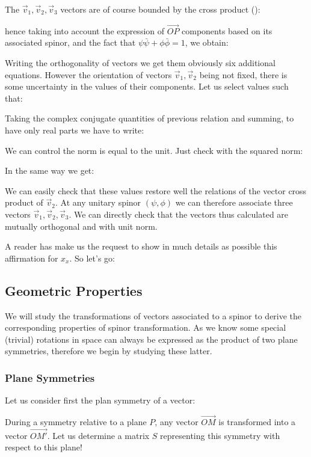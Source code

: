 	The $\vec{v}_1,\vec{v}_2,\vec{v}_3$ vectors are of course bounded by the cross product ():
	
	hence taking into account the expression of $\overrightarrow{OP}$ components based on its associated spinor, and the fact that $\psi\bar{\psi}+\phi\bar{\phi}=1$, we obtain:
	
	Writing the orthogonality of vectors we get them obviously six additional equations. However the orientation of vectors $\vec{v}_1,\vec{v}_2$ being not fixed, there is some uncertainty in the values of their components. Let us select values such that:
	
	Taking the complex conjugate quantities of previous relation and summing, to have only real parts we have to write:
	
	We can control the norm is equal to the unit. Just check with the squared norm:
	
	In the same way we get:
	
	We can easily check that these values restore well the relations of the vector cross product of $\vec{v}_2$. At any unitary spinor $(\psi,\phi)$ we can therefore associate three vectors $\vec{v}_1,\vec{v}_2,\vec{v}_3$. We can directly check that the vectors thus calculated are mutually orthogonal and with unit norm.
	
	A reader has make us the request to show in much details as possible this affirmation for $x_x$. So let's go:
	 
	
	\subsection{Geometric Properties}
	We will study the transformations of vectors associated to a spinor to derive the corresponding properties of spinor transformation. As we know some special (trivial) rotations in space can always be expressed as the product of two plane symmetries, therefore we begin by studying these latter.
	
	\subsubsection{Plane Symmetries}
	Let us consider first the plan symmetry of a vector:
	
	During a symmetry relative to a plane $P$, any vector $\overrightarrow{OM}$ is transformed into a vector $\overrightarrow{OM'}$. Let us determine a matrix $S$ representing this symmetry with respect to this plane! 
	
